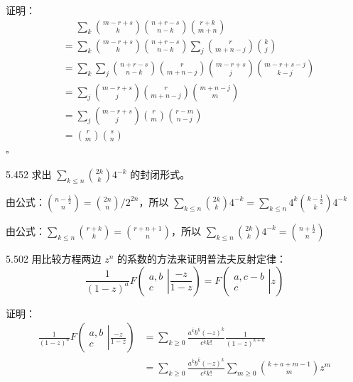 证明：
\begin{align*}
  &\phantom{=} \sum_k \binom{m-r+s}{k} \binom{n+r-s}{n-k} \binom{r+k}{m+n} \\
  &= \sum_k \binom{m-r+s}{k} \binom{n+r-s}{n-k} \sum_j \binom{r}{m+n-j} \binom{k}{j} \\
  &= \sum_k \sum_j \binom{n+r-s}{n-k} \binom{r}{m+n-j} \binom{m-r+s}{j} \binom{m-r+s-j}{k-j} \\
  &= \sum_j \binom{m-r+s}{j} \binom{r}{m+n-j} \binom{m+n-j}{m} \\
  &= \sum_j \binom{m-r+s}{j} \binom{r}{m} \binom{r-m}{n-j} \\
  &= \binom{r}{m} \binom{s}{n}
\end{align*}
\hfill \( \square \)

\begin{problem}{5.45}{2}
  求出 \( \sum_{k \le n} \binom{2k}{k} 4^{-k} \) 的封闭形式。
\end{problem}

由公式：\( \binom{n-\frac{1}{2}}{n} = \binom{2n}{n} / 2^{2n} \)，所以 \( \sum_{k \le n} \binom{2k}{k} 4^{-k} = \sum_{k \le n} 4^k \binom{k - \frac{1}{2}}{k} 4^{-k} \)

由公式：\( \sum_{k \le n} \binom{r+k}{k} = \binom{r+n+1}{n} \)，所以 \( \sum_{k \le n} \binom{2k}{k} 4^{-k} = \binom{n + \frac{1}{2}}{n} \)

\begin{problem}{5.50}{2}
  用比较方程两边 \( z^n \) 的系数的方法来证明普法夫反射定律：
  \[
    \frac{1}{(1-z)^a} F
    \left( \left.
      \begin{array}{cccc}
        a, b \\
        c
    \end{array} \right|{\frac{-z}{1-z}} \right)
    =
    F
    \left( \left.
      \begin{array}{cccc}
        a, c-b \\
        c
    \end{array} \right|{z} \right)
  \]
\end{problem}

证明：
\begin{align*}
  \frac{1}{(1-z)^a} F
  \left( \left.
    \begin{array}{cccc}
      a, b \\
      c
  \end{array} \right|{\frac{-z}{1-z}} \right)
  &= \sum_{k \ge 0} \frac{a^{\overline{k}} b^{\overline{k}} (-z)^k}{c^{\overline{k}} k!} \frac{1}{(1-z)^{k+a}} \\
  &= \sum_{k \ge 0} \frac{a^{\overline{k}} b^{\overline{k}} (-z)^k}{c^{\overline{k}} k!} \sum_{m \ge 0} \binom{k+a+m-1}{m} z^m
\end{align*}

